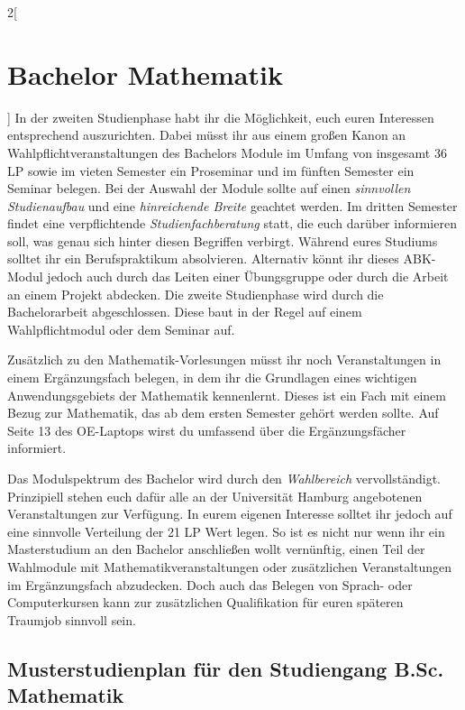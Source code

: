 \begin{multicols}{2}[\section{Bachelor Mathematik}]
In der zweiten Studienphase habt ihr die Möglichkeit, euch euren Interessen
entsprechend auszurichten. Dabei müsst ihr aus einem großen Kanon an
Wahlpflichtveranstaltungen des Bachelors Module im Umfang von insgesamt 36 LP
sowie im vieten Semester ein Proseminar und im fünften Semester ein Seminar
belegen. Bei der Auswahl der Module sollte auf einen \emph{sinnvollen
Studienaufbau} und eine \emph{hinreichende Breite} geachtet werden.  Im dritten
Semester findet eine verpflichtende \emph{Studienfachberatung} statt, die euch
darüber informieren soll, was genau sich hinter diesen Begriffen verbirgt.
Während eures Studiums solltet ihr ein Berufspraktikum absolvieren. Alternativ
könnt ihr dieses ABK-Modul jedoch auch durch das Leiten einer Übungsgruppe oder
durch die Arbeit an einem Projekt abdecken.  Die zweite Studienphase wird durch
die Bachelorarbeit abgeschlossen. Diese baut in der Regel auf einem
Wahlpflichtmodul oder dem Seminar auf.


Zusätzlich zu den Mathematik-Vorlesungen müsst ihr noch Veranstaltungen in
einem Ergänzungsfach belegen, in dem ihr die Grundlagen eines wichtigen
Anwendungsgebiets der Mathematik kennenlernt. Dieses ist ein Fach mit einem
Bezug zur Mathematik, das ab dem ersten Semester gehört werden sollte.  Auf
Seite 13 des OE-Laptops wirst du umfassend über die Ergänzungsfächer
informiert.

Das Modulspektrum des Bachelor wird durch den \emph{Wahlbereich}
vervollständigt. Prinzipiell stehen euch dafür alle an der Universität Hamburg
angebotenen Veranstaltungen zur Verfügung.  In eurem eigenen Interesse solltet
ihr jedoch auf eine sinnvolle Verteilung der 21 LP Wert legen. So ist es nicht
nur wenn ihr ein Masterstudium an den Bachelor anschließen wollt vernünftig,
einen Teil der Wahlmodule mit Mathematikveranstaltungen oder zusätzlichen
Veranstaltungen im Ergänzungsfach abzudecken.  Doch auch das Belegen von
Sprach- oder Computerkursen kann zur zusätzlichen Qualifikation für euren
späteren Traumjob sinnvoll sein.
\end{multicols}
\clearpage

\subsection{Musterstudienplan für den Studiengang B.Sc. Mathematik}

